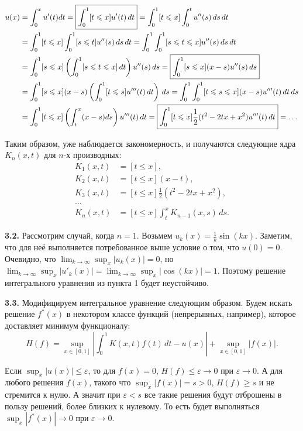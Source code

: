 \documentclass[a4paper, 12pt, onepage]{article}
\begin{document}
\begin{align*}
  u(x) &= \int_0^x u'(t) dt
        = \framebox{$\displaystyle \int_0^1 [t \leqslant x] u'(t) \,dt$}
        = \int_0^1 [t \leqslant x] \int_0^t u''(s) \,ds\, dt \\
       &= \int_0^1 [t \leqslant x] \int_0^1 [s \leqslant t] u''(s) \,ds\, dt
        = \int_0^1 \int_0^1 [s \leqslant t \leqslant x] u''(s) \,ds\, dt \\
       &= \int_0^1 [s \leqslant x] \left(\int_0^1 [s \leqslant t \leqslant x] \,dt\right) u''(s) \,ds
        = \framebox{$\displaystyle \int_0^1 [s \leqslant x] (x - s) u''(s) \,ds$} \\
       &= \int_0^1 [s \leqslant x] (x - s) \left(\int_0^1 [t \leqslant s] u'''(t) \,dt\right)\, ds
        = \int_0^1 \int_0^1 [t \leqslant s \leqslant x] (x - s) u'''(t) \,dt\, ds \\
       &= \int_0^1 [t \leqslant x] \left(\int_t^x (x - s) ds\right) u'''(t) \,dt
        = \framebox{$\displaystyle \int_0^1 [t \leqslant x] \frac12 (t^2 - 2tx + x^2) u'''(t) \,dt$} = \ldots
\end{align*}

Таким образом, уже наблюдается закономерность, и получаются следующие
ядра $K_n(x, t)$ для $n$-х производных:
\begin{align*}
  K_1(x, t) &= [t \leqslant x], \\
  K_2(x, t) &= [t \leqslant x] (x - t), \\
  K_3(x, t) &= [t \leqslant x] \frac12 (t^2 - 2tx + x^2), \\
  \ldots  \\
  K_n(x, t) &= [t \leqslant x] \int_t^x K_{n-1}(x, s) \, ds.
\end{align*}

\textbf{3.2.} Рассмотрим случай, когда $n=1$.
Возьмем $u_k(x) = \frac1k \sin(kx)$. Заметим, что для неё выполняется потребованное выше условие о том, что $u(0)=0$.
Очевидно, что $\lim_{k\to\infty} \sup_x |u_k(x)| = 0$, но
$\lim_{k\to\infty} \sup_x |u'_k(x)| = \lim_{k\to\infty} \sup_x |\cos(kx)| = 1.$
Поэтому решение интегрального уравнения из пункта 1 будет неустойчиво.

\textbf{3.3.} Модифицируем интегральное уравнение следующим образом. Будем искать решение $f^*(x)$ в некотором классе
функций (непрерывных, например), которое доставляет минимум функционалу:
$$H(f) = \sup_{x \in [0, 1]} \left|\int_0^1 K(x, t) f(t) \, dt - u(x)\right| + \sup_{x \in [0, 1]} |f(x)|. $$

Если $\sup_x |u(x)| \leqslant \varepsilon$, то для $f(x) = 0$, $H(f) \leqslant \varepsilon \to 0$ при $\varepsilon \to 0$.
А для любого решения $f(x)$, такого что $\sup_x |f(x)| = s > 0$, $H(f) \geqslant s$ и не стремится к нулю.
А значит при $\varepsilon < s$ все такие решения будут отброшены в пользу решений, более близких к нулевому.
То есть будет выполняться $\sup_x |f^*(x)| \to 0$ при $\varepsilon \to 0$.
\end{document}
